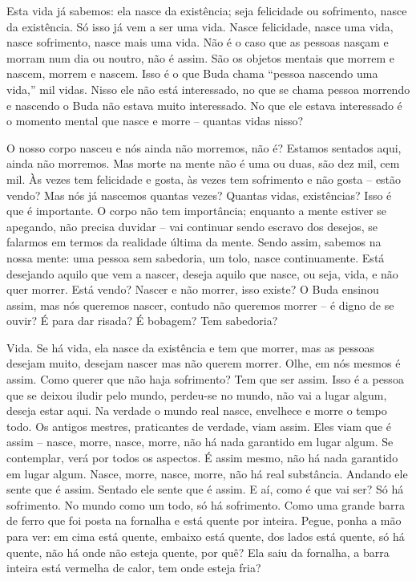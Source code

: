 Esta vida já sabemos: ela nasce da existência; seja felicidade ou
sofrimento, nasce da existência. Só isso já vem a ser uma vida. Nasce
felicidade, nasce uma vida, nasce sofrimento, nasce mais uma vida. Não
é o caso que as pessoas nasçam e morram num dia ou noutro, não é assim.
São os objetos mentais que morrem e nascem, morrem e nascem. Isso é o
que Buda chama “pessoa nascendo uma vida,” mil vidas. Nisso ele não
está interessado, no que se chama pessoa morrendo e nascendo o Buda não
estava muito interessado. No que ele estava interessado é o momento
mental que nasce e morre – quantas vidas nisso? 

O nosso corpo nasceu e nós ainda não morremos, não é? Estamos
sentados aqui, ainda não morremos. Mas morte na mente não é uma ou
duas, são dez mil, cem mil. Às vezes tem felicidade e gosta, às vezes
tem sofrimento e não gosta – estão vendo? Mas nós já nascemos quantas
vezes? Quantas vidas, existências? Isso é que é importante. O corpo não
tem importância; enquanto a mente estiver se apegando, não precisa
duvidar – vai continuar sendo escravo dos desejos, se falarmos em
termos da realidade última da mente. Sendo assim, sabemos na nossa
mente: uma pessoa sem sabedoria, um tolo, nasce continuamente. Está
desejando aquilo que vem a nascer, deseja aquilo que nasce, ou seja,
vida, e não quer morrer. Está vendo? Nascer e não morrer, isso existe?
O Buda ensinou assim, mas nós queremos nascer, contudo não queremos
morrer – é digno de se ouvir? É para dar risada? É bobagem? Tem
sabedoria? 

Vida. Se há vida, ela nasce da existência e tem que morrer, mas as
pessoas desejam muito, desejam nascer mas não querem morrer. Olhe, em
nós mesmos é assim. Como querer que não haja sofrimento? Tem que ser
assim. Isso é a pessoa que se deixou iludir pelo mundo, perdeu-se no
mundo, não vai a lugar algum, deseja estar aqui. Na verdade o mundo
real nasce, envelhece e morre o tempo todo. Os antigos mestres,
praticantes de verdade, viam assim. Eles viam que é assim – nasce,
morre, nasce, morre, não há nada garantido em lugar algum. Se
contemplar, verá por todos os aspectos. É assim mesmo, não há nada
garantido em lugar algum. Nasce, morre, nasce, morre, não há real
substância. Andando ele sente que é assim. Sentado ele sente que é
assim. E aí, como é que vai ser? Só há sofrimento. No mundo como um
todo, só há sofrimento. Como uma grande barra de ferro que foi posta na
fornalha e está quente por inteira. Pegue, ponha a mão para ver: em
cima está quente, embaixo está quente, dos lados está quente, só há
quente, não há onde não esteja quente, por quê? Ela saiu da fornalha, a
barra inteira está vermelha de calor, tem onde esteja fria? 

